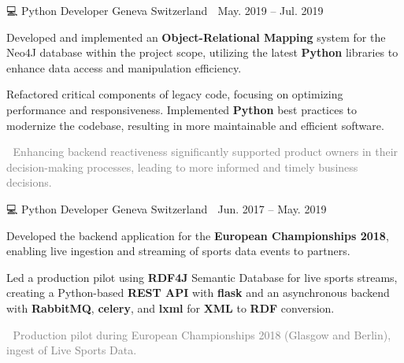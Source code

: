 \documentclass{awesome-cv}
\newcommand{\hll}[1]{\noindent\colorbox{light-gray}{\parbox{17.5cm}{\textcolor{gray}{#1}}}}
\begin{document}
{\begin{cventries}

        {💻 Python Developer} %
        {Geneva Switzerland 📍} %
        {May. 2019 – Jul. 2019 📆} %
        {\begin{cvitems}
                \item {Developed and implemented an \textbf{Object-Relational Mapping} system for the Neo4J database within the project scope, utilizing the latest \textbf{Python} libraries to enhance data access and manipulation efficiency.}
                \item {Refactored critical components of legacy code, focusing on optimizing performance and responsiveness. Implemented \textbf{Python} best practices to modernize the codebase, resulting in more maintainable and efficient software.}
                \\
                \newline
                \hll{🎯 Enhancing backend reactiveness significantly supported product owners in their decision-making processes, leading to more informed and timely business decisions.}
            \end{cvitems}
        }


        {💻 Python Developer} %
        {Geneva Switzerland 📍} %
        {Jun. 2017 – May. 2019 📆} %
        {\begin{cvitems}
                \item {Developed the backend application for the \textbf{European Championships 2018}, enabling live ingestion and streaming of sports data events to partners.}
                \item {Led a production pilot using \textbf{RDF4J} Semantic Database for live sports streams, creating a Python-based \textbf{REST API} with \textbf{flask} and an asynchronous backend with \textbf{RabbitMQ}, \textbf{celery}, and \textbf{lxml} for \textbf{XML} to \textbf{RDF} conversion.}
                \\
                \newline
                \hll{🎯 Production pilot during European Championships 2018 (Glasgow and Berlin), ingest of Live Sports Data.}
            \end{cvitems}
        }


\end{cventries}}
\end{document}
